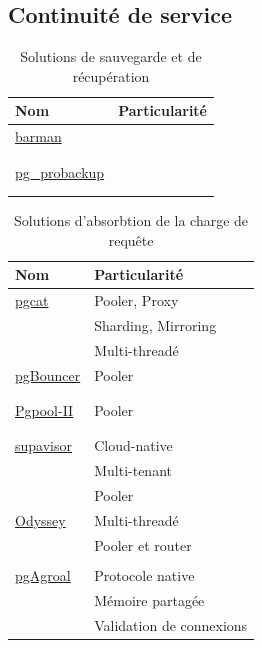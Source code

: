 \documentclass[a4paper,12pt]{article}
\begin{document}
\begin{multicols*}{2}
\subsection*{Continuité de service}
\label{sec:orge03c9b3}
\begin{table}[H]
\caption{Solutions de sauvegarde et de récupération}
\centering
\begin{tabular}{ll}
Nom & Particularité\\
\hline
\href{https://github.com/EnterpriseDB/barman}{barman} & \\
 & \\
 & \\
\href{https://github.com/postgrespro/pg\_probackup}{pg\_probackup} & \\
 & \\
 & \\
\end{tabular}
\end{table}

\begin{table}[H]
\caption{Solutions d'absorbtion de la charge de requête}
\centering
\begin{tabular}{ll}
Nom & Particularité\\
\hline
\href{https://github.com/postgresml/pgcat}{pgcat} & Pooler, Proxy\\
 & Sharding, Mirroring\\
 & Multi-threadé\\
\href{https://github.com/pgbouncer/pgbouncer}{pgBouncer} & Pooler\\
 & \\
 & \\
\href{https://github.com/pgpool/pgpool2}{Pgpool-II} & Pooler\\
 & \\
 & \\
\href{https://github.com/supabase/supavisor}{supavisor} & Cloud-native\\
 & Multi-tenant\\
 & Pooler\\
\href{https://github.com/yandex/odyssey}{Odyssey} & Multi-threadé\\
 & Pooler et router\\
 & \\
\href{https://github.com/agroal/pgagroal}{pgAgroal} & Protocole native\\
 & Mémoire partagée\\
 & Validation de connexions\\
\end{tabular}
\end{table}


\end{multicols*}
\end{document}
